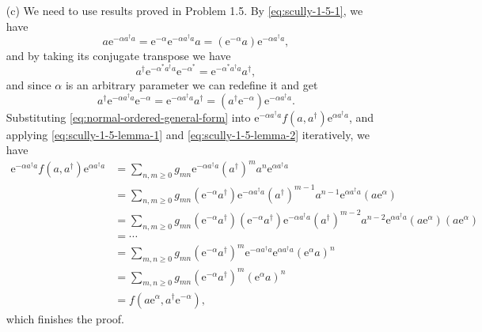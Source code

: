 \documentclass[hyperref, a4paper]{article}
\newcommand*{\ee}{\mathrm{e}}
\begin{document}
\begin{itemize}
\begin{equation}
\end{equation}
\item[(c)] We need to use results proved in Problem 1.5. By \eqref{eq:scully-1-5-1}, we have
\begin{equation}
    a \ee^{- \alpha a^\dagger a} = \ee^{- \alpha} \ee^{- \alpha a^\dagger a} a = (\ee^{-\alpha} a) \ee^{- \alpha a^\dagger a}, 
    \label{eq:scully-1-5-lemma-1}
\end{equation}
and by taking its conjugate transpose we have
\[
    a^\dagger \ee^{- \alpha^* a^\dagger a} \ee^{- \alpha^*} = \ee^{- \alpha^* a^\dagger a} a^\dagger,
\]
and since $\alpha$ is an arbitrary parameter we can redefine it and get
\begin{equation}
    a^\dagger \ee^{- \alpha a^\dagger a} \ee^{- \alpha} = \ee^{- \alpha a^\dagger a} a^\dagger = (a^\dagger \ee^{-\alpha}) \ee^{- \alpha a^\dagger a}.
    \label{eq:scully-1-5-lemma-2}
\end{equation}
Substituting \eqref{eq:normal-ordered-general-form} into $\ee^{-\alpha a^\dagger a} f(a, a^\dagger) \ee^{\alpha a^\dagger a}$, and applying \eqref{eq:scully-1-5-lemma-1} and \eqref{eq:scully-1-5-lemma-2} iteratively, we have
\[
    \begin{aligned}
        \ee^{-\alpha a^\dagger a} f(a, a^\dagger) \ee^{\alpha a^\dagger a} &= \sum_{n, m \geq 0} g_{mn} \ee^{-\alpha a^\dagger a} (a^\dagger)^m a^n \ee^{\alpha a^\dagger a} \\
        &= \sum_{n, m \geq 0} g_{mn} (\ee^{-\alpha} a^\dagger) \ee^{-\alpha a^\dagger a} (a^\dagger)^{m-1} a^{n-1} \ee^{\alpha a^\dagger a} (a \ee^{\alpha}) \\
        &= \sum_{n, m \geq 0} g_{mn} (\ee^{-\alpha} a^\dagger) (\ee^{-\alpha} a^\dagger) \ee^{-\alpha a^\dagger a} (a^\dagger)^{m-2} a^{n-2} \ee^{\alpha a^\dagger a} (a \ee^{\alpha}) (a \ee^{\alpha}) \\
        &= \cdots \\
        &= \sum_{m, n \geq 0} g_{mn} (\ee^{-\alpha} a^\dagger)^m \ee^{-\alpha a^\dagger a} \ee^{\alpha a^\dagger a} (\ee^{\alpha} a)^n \\
        &= \sum_{m, n \geq 0} g_{mn} (\ee^{-\alpha} a^\dagger)^m (\ee^{\alpha} a)^n \\
        &= f(a \ee^{\alpha}, a^\dagger \ee^{-\alpha}),
    \end{aligned}
\]
which finishes the proof.
\end{itemize}
\end{document}
